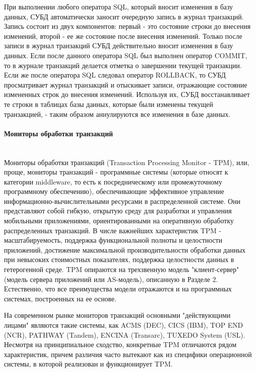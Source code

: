 При выполнении любого оператора SQL, который вносит изменения в базу данных, СУБД автоматически заносит
очередную запись в журнал транзакций. Запись состоит из двух компонентов: первый - это состояние строки до
внесения изменений, второй - ее же состояние после внесения изменений. Только после записи в журнал транзакций
СУБД действительно вносит изменения в базу данных. Если после данного оператора SQL был выполнен оператор
COMMIT, то в журнале транзакций делается отметка о завершении текущей транзакции. Если же после
оператора SQL следовал оператор ROLLBACK, то СУБД просматривает журнал транзакций и отыскивает записи,
отражающие состояние измененных строк до внесения изменений. Используя их, СУБД восстанавливает те
строки в таблицах базы данных, которые были изменены текущей транзакцией, - таким образом
аннулируются все изменения в базе данных.

\paragraph{Мониторы обработки транзакций}~\\
Мониторы обработки транзакций (Transaction Processing Monitor - TPM), или, проще, мониторы
транзакций - программные системы (которые относят к категории middleware, то есть к посредническому
или промежуточному программному обеспечению), обеспечивающие эффективное управление информационно-вычислительными
ресурсами в распределенной системе. Они представляют собой гибкую, открытую среду для разработки и
управления мобильными приложениями, ориентированными на оперативную обработку распределенных транзакций.
В числе важнейших характеристик TPM - масштабируемость, поддержка функциональной полноты и целостности
приложений, достижение максимальной производительности обработки данных при невысоких стоимостных
показателях, поддержка целостности данных в гетерогенной среде. TPM опираются на трехзвенную
модель "клиент-сервер" (модель сервера приложений или AS-модель), описанную в Разделе 2.
Естественно, что все преимущества модели отражаются и на программных системах, построенных на ее основе.

На современном рынке мониторов транзакций основными "действующими лицами" являются такие системы,
как ACMS (DEC), CICS (IBM), TOP END (NCR), PATHWAY (Tandem), ENCINA (Transarc), TUXEDO System (USL).
Несмотря на принципиальное сходство, конкретные TPM отличаются рядом характеристик, причем
различия часто вытекают как из специфики операционной системы, в которой реализован и функционирует TPM.

